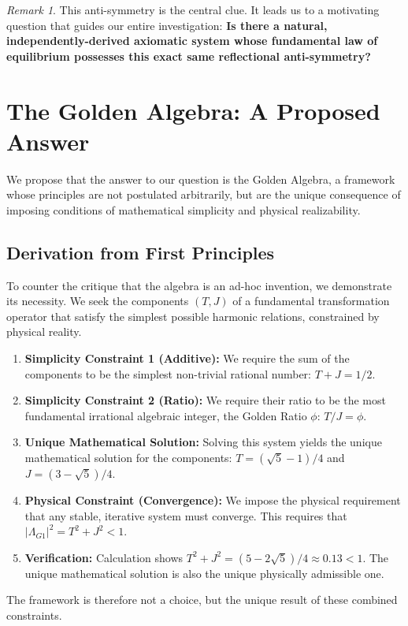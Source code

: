 \documentclass{article}
\theoremstyle{plain}
\theoremstyle{definition}
\theoremstyle{remark}
\newtheorem*{remark}{Remark}
\begin{document}
\begin{remark}
This anti-symmetry is the central clue. It leads us to a motivating question that guides our entire investigation: \textbf{Is there a natural, independently-derived axiomatic system whose fundamental law of equilibrium possesses this exact same reflectional anti-symmetry?}
\end{remark}

\section{The Golden Algebra: A Proposed Answer}
\label{sec:algebra}
We propose that the answer to our question is the Golden Algebra, a framework whose principles are not postulated arbitrarily, but are the unique consequence of imposing conditions of mathematical simplicity and physical realizability.

\subsection{Derivation from First Principles}
To counter the critique that the algebra is an ad-hoc invention, we demonstrate its necessity. We seek the components $(T, J)$ of a fundamental transformation operator that satisfy the simplest possible harmonic relations, constrained by physical reality.
\begin{enumerate}
    \item \textbf{Simplicity Constraint 1 (Additive):} We require the sum of the components to be the simplest non-trivial rational number: $T+J=1/2$.
    \item \textbf{Simplicity Constraint 2 (Ratio):} We require their ratio to be the most fundamental irrational algebraic integer, the Golden Ratio $\phi$: $T/J=\phi$.
    \item \textbf{Unique Mathematical Solution:} Solving this system yields the unique mathematical solution for the components: $T = (\sqrt{5}-1)/4$ and $J = (3-\sqrt{5})/4$.
    \item \textbf{Physical Constraint (Convergence):} We impose the physical requirement that any stable, iterative system must converge. This requires that $|\Lambda_{G1}|^2 = T^2+J^2 < 1$.
    \item \textbf{Verification:} Calculation shows $T^2+J^2 = (5-2\sqrt{5})/4 \approx 0.13 < 1$. The unique mathematical solution is also the unique physically admissible one.
\end{enumerate}
The framework is therefore not a choice, but the unique result of these combined constraints.
\end{document}

